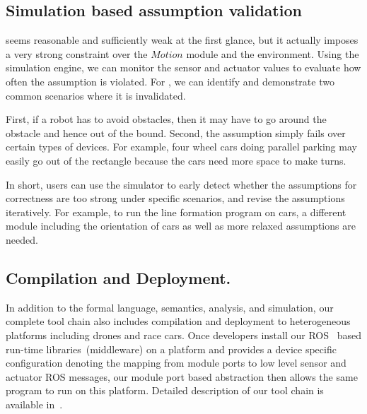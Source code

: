 \subsection{Simulation based assumption validation}

 seems reasonable and sufficiently weak at the first glance,
but it actually imposes a very strong constraint over the $Motion$ module and the environment.
Using the simulation engine, we can monitor the sensor and actuator values to evaluate how often the assumption is violated.
For , we can identify and demonstrate two common scenarios
where it is invalidated.

First, if a robot has to avoid obstacles,
then it may have to go around the obstacle and hence out of the bound.
Second, the assumption simply fails over certain types of devices.
For example, four wheel cars doing parallel parking may easily go out of the rectangle
because the cars need more space to make turns.

In short, users can use the simulator to early detect whether
the assumptions for correctness are too strong under specific scenarios,
and revise the assumptions iteratively.
For example, to run the line formation program on cars,
a different module including the orientation of cars as well as more relaxed assumptions are needed.

\subsection{Compilation and Deployment.}
In addition to the formal language, semantics, analysis, and simulation,
our complete tool chain also includes compilation and deployment to heterogeneous platforms including drones and race cars.
Once developers install our ROS~\cite{ros} based run-time libraries~(middleware) on a platform
and provides a device specific configuration denoting the mapping from \lgname module ports
to low level sensor and actuator ROS messages,
our module port based abstraction then allows the same \lgname program to run on this platform.
Detailed description of our tool chain is available in~\cite{ghosh2019cyphyhouse}.
